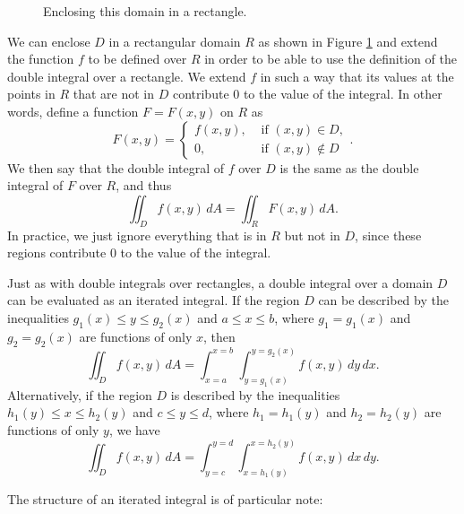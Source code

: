\begin{figure}[ht]
\begin{center}
\begin{minipage}{2.5in}
\begin{center}
\end{center}
\caption{Enclosing this domain in a rectangle.}
\label{F:11.3.nonrect_domain_2}
\end{minipage}
\end{center}
\end{figure}
We can enclose $D$ in a rectangular domain $R$ as shown in Figure \ref{F:11.3.nonrect_domain_2} and extend the function $f$ to be defined over $R$ in order to be able to use the definition of the double integral over a rectangle.  We extend $f$ in such a way that its values at the points in $R$ that are not in $D$ contribute 0 to the value of the integral. In other words, define a function $F = F(x, y)$ on $R$ as
\[F(x,y) = \begin{cases} f(x,y), &\text{ if } (x,y) \in D, \\ 0, &\text{ if } (x,y) \not\in D \end{cases}.\]
We then say that the double integral of $f$ over $D$ is the same as the double integral of $F$ over $R$, and thus
\[\iint_D f(x,y) \, dA = \iint_R F(x,y) \, dA.\]
In practice, we just ignore everything that is in $R$ but not in $D$, since these regions contribute 0 to the value of the integral.

Just as with double integrals over rectangles, a double integral over a domain $D$ can be evaluated as an iterated integral.  If the region $D$ can be described by the inequalities $g_1(x) \leq y \leq g_2(x)$ and $a \leq x \leq b$, where $g_1=g_1(x)$ and $g_2=g_2(x)$ are functions of only $x$, then  
\[\iint_D f(x,y) \, dA = \int_{x=a}^{x=b} \int_{y=g_1(x)}^{y=g_2(x)} f(x,y) \, dy \, dx.\]
Alternatively, if the region $D$ is described by the inequalities $h_1(y) \leq x \leq h_2(y)$ and $c \leq y \leq d$, where $h_1=h_1(y)$ and $h_2=h_2(y)$ are functions of only $y$, we have
\[\iint_D f(x,y) \, dA = \int_{y=c}^{y=d} \int_{x=h_1(y)}^{x=h_2(y)} f(x,y) \, dx \, dy.\]

The structure of an iterated integral is of particular note:

\vspace*{5pt}
\nin {}
\vspace*{5pt}


